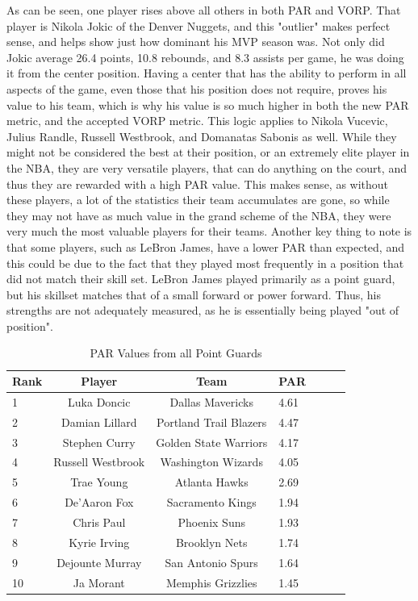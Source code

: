 \documentclass[12pt, titlepage]{article}
\begin{document}
As can be seen, one player rises above all others in both PAR and VORP. That player is Nikola Jokic of the 
Denver Nuggets, and this "outlier" makes perfect sense, and helps show just how dominant his MVP 
season was. Not only did Jokic average 26.4 points, 10.8 rebounds, and 8.3 assists per game, he was 
doing it from the center position. Having a center that has the ability to perform in all aspects of the game, 
even those that his position does not require, proves his value to his team, which is why his value is so 
much higher in both the new PAR metric, and the accepted VORP metric. This logic applies to Nikola 
Vucevic, Julius Randle, Russell Westbrook, and Domanatas Sabonis as well. While they might not be 
considered the best at their position, or an extremely elite player in the NBA, they are very versatile players, 
that can do anything on the court, and thus they are rewarded with a high PAR value. This makes sense, as 
without these players, a lot of the statistics their team accumulates are gone, so while they may not have as 
much value in the grand scheme of the NBA, they were very much the most valuable players for their 
teams. Another key thing to note is that some players, such as LeBron James, have a lower PAR than 
expected, and this could be due to the fact that they played most frequently in a position that did not match 
their skill set. LeBron James played primarily as a point guard, but his skillset matches that of a small 
forward or power forward. Thus, his strengths are not adequately measured, as he is essentially being 
played "out of position".

\begin{table}[H]
  \caption{PAR Values from all Point Guards}
  \label{tab:PGtable}
\centering
\begin{tabular}[t]{lccllll}
  \toprule
  Rank & Player & Team & PAR\\
  \midrule
 1 & Luka Doncic & Dallas Mavericks & 4.61\\
  \midrule
 2 & Damian Lillard & Portland Trail Blazers & 4.47\\
  \midrule
 3 & Stephen Curry & Golden State Warriors & 4.17\\
  \midrule
 4 & Russell Westbrook & Washington Wizards & 4.05\\
  \midrule
 5 & Trae Young & Atlanta Hawks & 2.69\\
  \midrule
 6 & De'Aaron Fox & Sacramento Kings & 1.94\\
  \midrule
 7 & Chris Paul & Phoenix Suns & 1.93\\
  \midrule
 8 & Kyrie Irving & Brooklyn Nets & 1.74\\
  \midrule
 9 & Dejounte Murray & San Antonio Spurs & 1.64\\
  \midrule
 10 & Ja Morant & Memphis Grizzlies & 1.45\\
  \bottomrule
\end{tabular}
\end{table}
\end{document}
